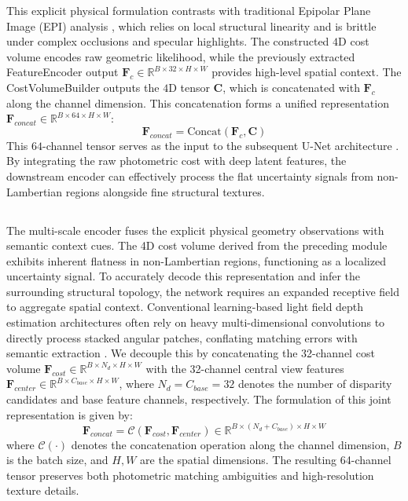 \documentclass[lettersize,journal]{IEEEtran}
\begin{document}
This explicit physical formulation contrasts with traditional Epipolar Plane Image (EPI) analysis \cite{wanner2014}, which relies on local structural linearity and is brittle under complex occlusions and specular highlights. The constructed $4\text{D}$ cost volume encodes raw geometric likelihood, while the previously extracted FeatureEncoder output $\mathbf{F}_c \in \mathbb{R}^{B \times 32 \times H \times W}$ provides high-level spatial context. The CostVolumeBuilder outputs the $4\text{D}$ tensor $\mathbf{C}$, which is concatenated with $\mathbf{F}_c$ along the channel dimension. This concatenation forms a unified representation $\mathbf{F}_{concat} \in \mathbb{R}^{B \times 64 \times H \times W}$:
\begin{equation}
\mathbf{F}_{concat} = \text{Concat}(\mathbf{F}_c, \mathbf{C})
\end{equation}
This $64$-channel tensor serves as the input to the subsequent U-Net architecture \cite{ronneberger2015}. By integrating the raw photometric cost with deep latent features, the downstream encoder can effectively process the flat uncertainty signals from non-Lambertian regions alongside fine structural textures.

\subsection{}

The multi-scale encoder fuses the explicit physical geometry observations with semantic context cues. The 4D cost volume derived from the preceding module exhibits inherent flatness in non-Lambertian regions, functioning as a localized uncertainty signal. To accurately decode this representation and infer the surrounding structural topology, the network requires an expanded receptive field to aggregate spatial context. Conventional learning-based light field depth estimation architectures often rely on heavy multi-dimensional convolutions to directly process stacked angular patches, conflating matching errors with semantic extraction \cite{heber2018}. We decouple this by concatenating the 32-channel cost volume $\mathbf{F}_{cost} \in \mathbb{R}^{B \times N_d \times H \times W}$ with the 32-channel central view features $\mathbf{F}_{center} \in \mathbb{R}^{B \times C_{base} \times H \times W}$, where $N_d = C_{base} = 32$ denotes the number of disparity candidates and base feature channels, respectively. The formulation of this joint representation is given by:
\begin{equation}
\mathbf{F}_{concat} = \mathcal{C}(\mathbf{F}_{cost}, \mathbf{F}_{center}) \in \mathbb{R}^{B \times (N_d + C_{base}) \times H \times W}
\end{equation}
where $\mathcal{C}(\cdot)$ denotes the concatenation operation along the channel dimension, $B$ is the batch size, and $H, W$ are the spatial dimensions. The resulting 64-channel tensor preserves both photometric matching ambiguities and high-resolution texture details.
\end{document}
